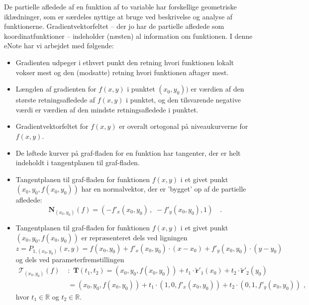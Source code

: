 \begin{summary}
De partielle afledede af en funktion af to variable har forskellige
geometriske iklædninger, som er særdeles nyttige at bruge ved beskrivelse
og analyse af funktionerne. Gradientvektorfeltet -- der jo har de partielle afledede som koordinatfunktioner -- indeholder
(næsten) al information om funktionen. I denne eNote har vi arbejdet med følgende:
\begin{itemize}
\item Gradienten udpeger i ethvert punkt den retning hvori funktionen lokalt vokser mest og den (modsatte) retning hvori funktionen aftager mest.
\item Længden af gradienten for $f(x,y)$ i punktet $(x_{0}, y_{0}))$ er værdien af den største retningsafledede af $f(x,y)$ i punktet, og den tilsvarende negative værdi er værdien af den mindste retningsafledede i punktet.
\item Gradientvektorfeltet for $f(x,y)$ er overalt ortogonal på niveaukurverne for $f(x,y)$.
\item De løftede kurver på graf-fladen for en funktion har tangenter, der er helt indeholdt i tangentplanen til graf-fladen.
\item Tangentplanen til graf-fladen for funktionen $f(x, y)$ i et givet punkt $(x_{0}, y_{0}, f(x_{0}, y_{0}))$ har en normalvektor, der er 'bygget' op af de partielle afledede:
    \begin{equation*}
    \mathbf{N}_{(x_{0}, y_{0})}(f) = (- f'_{x}(x_{0}, y_{0})\, , \, \, -f'_{y}(x_{0}, y_{0}), 1 ) \quad .
    \end{equation*}
\item Tangentplanen til graf-fladen for funktionen $f(x, y)$ i et givet punkt $(x_{0}, y_{0}, f(x_{0}, y_{0}))$ er repræsenteret dels ved ligningen
\begin{equation*}
z = P_{1, (x_{0}, y_{0})}(x,y) = f(x_{0}, y_{0}) + f'_{x}(x_{0}, y_{0})\cdot (x - x_{0}) + f'_{y}(x_{0}, y_{0})\cdot (y - y_{0})
\end{equation*}
og dels ved parameterfremstillingen
\begin{equation*}
\begin{aligned}
\mathcal{T}_{(x_{0}, y_{0})}(f) \, \,&: \, \, \mathbf{T}(t_{1}, t_{2}) = (x_{0}, y_{0}, f(x_{0}, y_{0})) + t_{1}\cdot \widetilde{\mathbf{r}}'_{1}(x_{0}) + t_{2}\cdot \widetilde{\mathbf{r}}'_{2}(y_{0}) \\
&= (x_{0}, y_{0}, f(x_{0}, y_{0}))+ t_{1}\cdot(1, 0, f'_{x}(x_{0}, y_{0})) +   t_{2}\cdot (0, 1, f'_{y}(x_{0}, y_{0})) \, \, ,
\end{aligned}
\end{equation*}
hvor $t_{1} \in \mathbb{R}$ og $t_{2} \in \mathbb{R}$.
\end{itemize}
\end{summary}







